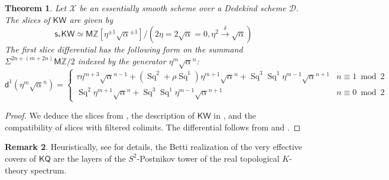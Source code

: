 \documentclass[11pt,hyp,english]{article}
\newcommand{\E}{\mathsf{E}}
\newcommand{\Z}{\mathbb{Z}}
\newcommand{\KQ}{\mathsf{KQ}}
\newcommand{\KW}{\mathsf{KW}}
\newcommand{\MZ}{\mathsf{M}\Z}
\newcommand{\SH}{\mathbf{SH}}
\newcommand{\Spec}{\operatorname{Spec}}
\newcommand{\Sq}{\operatorname{Sq}}
\newcommand{\s}{\mathsf{s}}
\newcommand{\vs}{\tilde{\mathsf{s}}}
\newcommand{\vf}{\tilde{{\mathsf{f}}}}
\newtheorem{theorem}{Theorem}[section]
\theoremstyle{definition}
\newtheorem{remark}[theorem]{Remark}
\begin{document}
\begin{theorem}\label{thm:slices-KW}
Let $\mathcal{X}$ be an essentially smooth scheme over a Dedekind scheme $\mathcal{D}$. 
The slices of $\KW$ are given by 
\[ \s_\ast \KW \simeq 
\MZ[\eta^{\pm 1}\sqrt{\alpha}^{\pm 1}]/(2\eta=2\sqrt{\alpha}=0, \eta^2\xrightarrow{\delta} \sqrt{\alpha}) \]
The first slice differential has the following form on the summand $\Sigma^{2n+(m+2n)}\MZ/2$ indexed by the 
generator $\eta^m\sqrt{\alpha}^n$:
\[ \mathsf{d}^1(\eta^m\sqrt{\alpha}^n) = \begin{cases} 
\tau \eta^{m+3}\sqrt{\alpha}^{n-1} +(\Sq^2+\rho\Sq^1)\eta^{m+1}\sqrt{\alpha}^n 
+\Sq^3\Sq^1\eta^{m-1}\sqrt{\alpha}^{n+1} & n\equiv 1 \bmod 2 \\ \Sq^2\eta^{m+1}\sqrt{\alpha}^n 
+\Sq^3\Sq^1\eta^{m-1}\sqrt{\alpha}^{n+1} & n\equiv 0 \bmod 2\end{cases}\]
\end{theorem}

\begin{proof}
We deduce the slices from , 
the description of $\KW$ in , 
and the compatibility of slices with filtered colimits.
The differential follows from \cite{RO:slices} and .
\end{proof}

\begin{remark}
Heuristically, 
see \cite[Section 6]{grso} for details, 
the Betti realization of the very effective covers of $\KQ$ are the layers of the 
$S^{2}$-Postnikov tower of the real topological $K$-theory spectrum. 
\end{remark}



\end{document}
